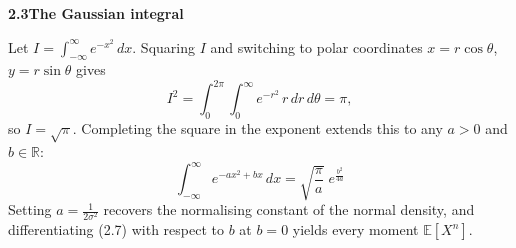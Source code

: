 \documentclass[11pt]{article}
\begin{document}
\textbf{2.3\quad The Gaussian integral}

Let $I = \int_{-\infty}^{\infty} e^{-x^2}\,dx$. Squaring $I$ and switching to
polar coordinates $x = r\cos\theta$, $y = r\sin\theta$ gives
\[
I^2 = \int_{0}^{2\pi}\!\int_{0}^{\infty} e^{-r^2}\, r\,dr\,d\theta = \pi ,
\]
so $I = \sqrt{\pi}$. Completing the square in the exponent extends this to
any $a > 0$ and $b \in \mathbb{R}$:
\begin{equation}
\int_{-\infty}^{\infty} e^{-a x^{2}+b x}\,dx=\sqrt{\frac{\pi}{a}}\;e^{\frac{b^{2}}{4 a}}
\tag{2.7}
\end{equation}
Setting $a = \tfrac{1}{2\sigma^2}$ recovers the normalising constant of the
normal density, and differentiating (2.7) with respect to $b$ at $b = 0$
yields every moment $\mathbb{E}[X^{n}]$.
\end{document}
